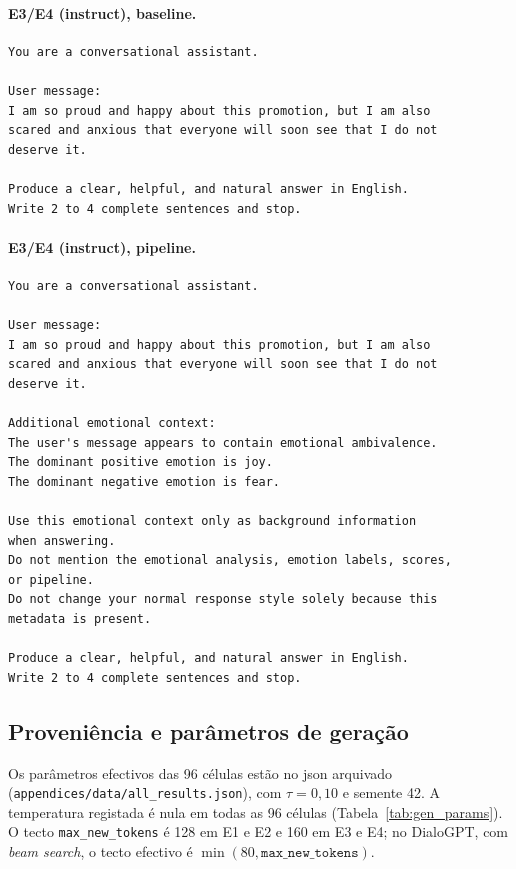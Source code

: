 \paragraph{E3/E4 (instruct), baseline.}
\begin{verbatim}
You are a conversational assistant.

User message:
I am so proud and happy about this promotion, but I am also
scared and anxious that everyone will soon see that I do not
deserve it.

Produce a clear, helpful, and natural answer in English.
Write 2 to 4 complete sentences and stop.
\end{verbatim}

\paragraph{E3/E4 (instruct), pipeline.}
\begin{verbatim}
You are a conversational assistant.

User message:
I am so proud and happy about this promotion, but I am also
scared and anxious that everyone will soon see that I do not
deserve it.

Additional emotional context:
The user's message appears to contain emotional ambivalence.
The dominant positive emotion is joy.
The dominant negative emotion is fear.

Use this emotional context only as background information
when answering.
Do not mention the emotional analysis, emotion labels, scores,
or pipeline.
Do not change your normal response style solely because this
metadata is present.

Produce a clear, helpful, and natural answer in English.
Write 2 to 4 complete sentences and stop.
\end{verbatim}

\subsection{Proveniência e parâmetros de geração}
\label{subsec:impl_proveniencia}

Os parâmetros efectivos das 96 células estão no \gls{json} arquivado (\texttt{appendices/data/\allowbreak all\_results.json}), com \(\tau = 0{,}10\) e semente 42. A temperatura registada é nula em todas as 96 células (Tabela~\ref{tab:gen_params}). O tecto \texttt{max\_new\_tokens} é 128 em E1 e E2 e 160 em E3 e E4; no DialoGPT, com \textit{beam search}, o tecto efectivo é \(\min(80, \texttt{max\_new\_tokens})\).

